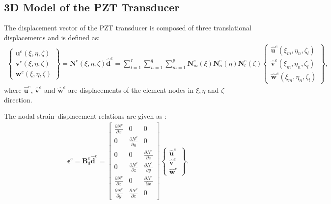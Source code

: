 \documentclass[sensors,article,accept,moreauthors,pdftex]{Definitions/mdpi}
\begin{document}
\subsection{3D Model of the PZT Transducer}
\label{sec:3D_SEM}
The displacement vector of the PZT transducer is composed of three translational displacements and  is defined as:
\begin{eqnarray}
\left \{ \begin{array}{c}
\textbf{u}^e(\xi,\eta,\zeta) \\
\textbf{v}^e(\xi,\eta,\zeta) \\
\textbf{w}^e(\xi,\eta,\zeta)
\end{array} \right\}
= \textbf{N}^e(\xi,\eta, \zeta)\widehat{\textbf{d}}^e
= \sum_{l=1}^r\sum_{n=1}^q\sum_{m=1}^p\textbf{N}_m^e(\xi)\textbf{N}_n^e(\eta)\textbf{N}_l^e(\zeta)
\left \{ \begin{array}{c}
\widehat{\textbf{u}}^e(\xi_m,\eta_n,\zeta_l) \\
\widehat{\textbf{v}}^e(\xi_m,\eta_n,\zeta_l) \\
\widehat{\textbf{w}}^e(\xi_m,\eta_n,\zeta_l)
\end{array} \right\},
\label{eq:3D_displ}
\end{eqnarray}
where \(\widehat{\textbf{u}}^e\), \(\widehat{\textbf{v}}^e\) and 
\(\widehat{\textbf{w}}^e\) are displacements of the element nodes in \(\xi,\eta\) and \(\zeta\) direction.

The nodal strain--displacement relations are given as \cite{kudela20093d}:
\begin{eqnarray}
\boldsymbol{\epsilon}^e=\textbf{B}_{d}^e\widehat{\textbf{d}}^e=
\left [
\begin{array}{ccc}
\frac{\partial N^e}{\partial x} & 0 & 0\\
0 & \frac{\partial N^e}{\partial y} & 0\\
0 & 0 & \frac{\partial N^e}{\partial z}\\
0 & \frac{\partial N^e}{\partial z} & \frac{\partial N^e}{\partial y}\\
\frac{\partial N^e}{\partial z} & 0 & \frac{\partial N^e}{\partial x}\\
\frac{\partial N^e}{\partial y} & \frac{\partial N^e}{\partial x} & 0
\end{array} \right]
\left \{ \begin{array}{c}
\widehat{\textbf{u}}^e \\
\widehat{\textbf{v}}^e \\
\widehat{\textbf{w}}^e
\end{array} \right\}.
\end{eqnarray}
\end{document}
